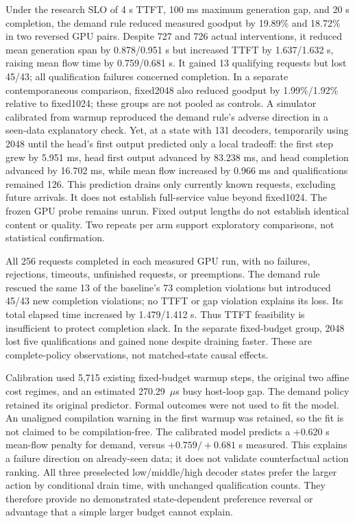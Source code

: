 Under the research SLO of 4 s TTFT, 100 ms maximum generation gap, and 20 s
completion, the demand rule reduced measured goodput by 19.89\% and 18.72\% in
two reversed GPU pairs. Despite 727 and 726 actual interventions, it reduced
mean generation span by 0.878/0.951 s but increased TTFT by 1.637/1.632 s,
raising mean flow time by 0.759/0.681 s. It gained 13 qualifying requests but
lost 45/43; all qualification failures concerned completion. In a separate
contemporaneous comparison, fixed2048 also reduced goodput by 1.99\%/1.92\%
relative to fixed1024; these groups are not pooled as controls. A simulator
calibrated from warmup reproduced the demand rule's adverse direction in a
seen-data explanatory check. Yet, at a state with 131 decoders, temporarily
using 2048 until the head's first output predicted only a local tradeoff: the
first step grew by 5.951 ms, head first output advanced by 83.238 ms, and head
completion advanced by 16.702 ms, while mean flow increased by 0.966 ms and
qualifications remained 126. This prediction drains only currently known
requests, excluding future arrivals. It does not establish full-service value
beyond fixed1024. The frozen GPU probe remains unrun. Fixed output lengths do
not establish identical content or quality. Two repeats per arm support
exploratory comparisons, not statistical confirmation.

All 256 requests completed in each measured GPU run, with no failures,
rejections, timeouts, unfinished requests, or preemptions. The demand rule
rescued the same 13 of the baseline's 73 completion violations but introduced
45/43 new completion violations; no TTFT or gap violation explains its loss.
Its total elapsed time increased by 1.479/1.412 s. Thus TTFT feasibility is
insufficient to protect completion slack. In the separate fixed-budget group,
2048 lost five qualifications and gained none despite draining faster.
These are complete-policy observations, not matched-state causal effects.

Calibration used 5,715 existing fixed-budget warmup steps, the original two
affine cost regimes, and an estimated 270.29~$\mu$s busy host-loop gap. The demand
policy retained its original predictor. Formal outcomes were not used to fit
the model. An unaligned compilation warning in the first warmup was retained,
so the fit is not claimed to be compilation-free. The calibrated model predicts
a $+0.620$ s mean-flow penalty for demand, versus $+0.759/+0.681$ s measured.
This explains a failure direction on already-seen data; it does not validate
counterfactual action ranking. All three preselected low/middle/high decoder
states prefer the larger action by conditional drain time, with unchanged
qualification counts. They therefore provide no demonstrated state-dependent
preference reversal or advantage that a simple larger budget cannot explain.


